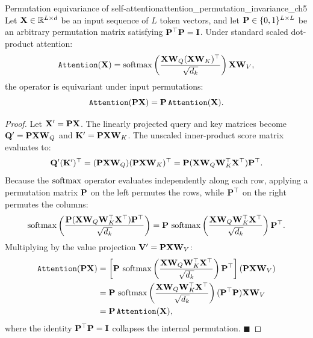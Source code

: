 \documentclass[../../main.tex]{subfiles}
\begin{document}
\begin{theorem}{Permutation equivariance of self-attention}{attention_permutation_invariance_ch5}
Let $\mathbf{X} \in \mathbb{R}^{L \times d}$ be an input sequence of $L$ token vectors, and let $\mathbf{P} \in \{0, 1\}^{L \times L}$ be an arbitrary permutation matrix satisfying $\mathbf{P}^\top \mathbf{P} = \mathbf{I}$. Under standard scaled dot-product attention:
\begin{equation}
\label{eq:standard_attention_op_ch5}
\text{\texttt{Attention}}(\mathbf{X}) = \operatorname{\mathrm{softmax}}\left(\frac{\mathbf{X} \mathbf{W}_Q (\mathbf{X} \mathbf{W}_K)^\top}{\sqrt{d_k}}\right) \mathbf{X} \mathbf{W}_V,
\end{equation}
the operator is equivariant under input permutations:
\begin{equation}
\label{eq:attention_permutation_proof_ch5}
\text{\texttt{Attention}}(\mathbf{P} \mathbf{X}) = \mathbf{P} \, \text{\texttt{Attention}}(\mathbf{X}).
\end{equation}
\end{theorem}
\begin{proof}
Let $\mathbf{X}' = \mathbf{P} \mathbf{X}$. The linearly projected query and key matrices become $\mathbf{Q}' = \mathbf{P} \mathbf{X} \mathbf{W}_Q$ and $\mathbf{K}' = \mathbf{P} \mathbf{X} \mathbf{W}_K$. The unscaled inner-product score matrix evaluates to:
\begin{equation}
\mathbf{Q}' (\mathbf{K}')^\top = (\mathbf{P} \mathbf{X} \mathbf{W}_Q) (\mathbf{P} \mathbf{X} \mathbf{W}_K)^\top = \mathbf{P} (\mathbf{X} \mathbf{W}_Q \mathbf{W}_K^\top \mathbf{X}^\top) \mathbf{P}^\top.
\end{equation}
Because the $\operatorname{\mathrm{softmax}}$ operator evaluates independently along each row, applying a permutation matrix $\mathbf{P}$ on the left permutes the rows, while $\mathbf{P}^\top$ on the right permutes the columns:
\begin{equation}
\operatorname{\mathrm{softmax}}\left(\frac{\mathbf{P} (\mathbf{X} \mathbf{W}_Q \mathbf{W}_K^\top \mathbf{X}^\top) \mathbf{P}^\top}{\sqrt{d_k}}\right) = \mathbf{P} \, \operatorname{\mathrm{softmax}}\left(\frac{\mathbf{X} \mathbf{W}_Q \mathbf{W}_K^\top \mathbf{X}^\top}{\sqrt{d_k}}\right) \mathbf{P}^\top.
\end{equation}
Multiplying by the value projection $\mathbf{V}' = \mathbf{P} \mathbf{X} \mathbf{W}_V$:
\begin{align}
\text{\texttt{Attention}}(\mathbf{P} \mathbf{X}) &= \left[ \mathbf{P} \, \operatorname{\mathrm{softmax}}\left(\frac{\mathbf{X} \mathbf{W}_Q \mathbf{W}_K^\top \mathbf{X}^\top}{\sqrt{d_k}}\right) \mathbf{P}^\top \right] (\mathbf{P} \mathbf{X} \mathbf{W}_V) \nonumber \\
&= \mathbf{P} \, \operatorname{\mathrm{softmax}}\left(\frac{\mathbf{X} \mathbf{W}_Q \mathbf{W}_K^\top \mathbf{X}^\top}{\sqrt{d_k}}\right) (\mathbf{P}^\top \mathbf{P}) \mathbf{X} \mathbf{W}_V \nonumber \\
&= \mathbf{P} \, \text{\texttt{Attention}}(\mathbf{X}),
\end{align}
where the identity $\mathbf{P}^\top \mathbf{P} = \mathbf{I}$ collapses the internal permutation. $\blacksquare$
\end{proof}
\end{document}
